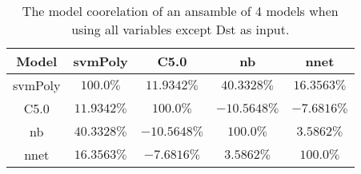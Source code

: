 \begin{table}[!ht]
	\centering
	\begin{tabular}{|c|c|c|c|c|}
		\hline
		Model & svmPoly & C5.0 & nb & nnet \\ \hline
		svmPoly & $100.0\%$ & $11.9342\%$ & $40.3328\%$ & $16.3563\%$ \\ \hline
		C5.0 & $11.9342\%$ & $100.0\%$ & $-10.5648\%$ & $-7.6816\%$ \\ \hline
		nb & $40.3328\%$ & $-10.5648\%$ & $100.0\%$ & $3.5862\%$ \\ \hline
		nnet & $16.3563\%$ & $-7.6816\%$ & $3.5862\%$ & $100.0\%$ \\ \hline
	\end{tabular}
	\caption{The model coorelation of an ansamble of 4 models when using all variables except Dst as input.}
	\label{tab:ansamble4:noDst}
\end{table}
